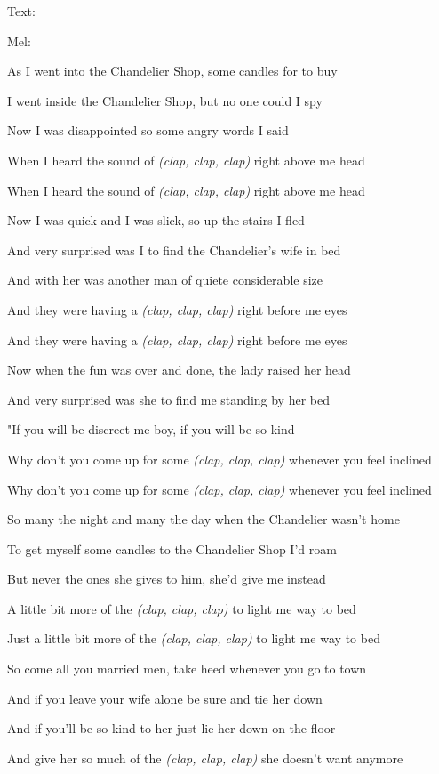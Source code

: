 Text: 

Mel: \bigskip

As I went into the Chandelier Shop, some candles for to buy

I went inside the Chandelier Shop, but no one could I spy

Now I was disappointed so some angry words I said

When I heard the sound of \emph{(clap, clap, clap)} right above me head

When I heard the sound of \emph{(clap, clap, clap)} right above me head\bigskip

Now I was quick and I was slick, so up the stairs I fled

And very surprised was I to find the Chandelier's wife in bed

And with her was another man of quiete considerable size

And they were having a \emph{(clap, clap, clap)} right before me eyes

And they were having a \emph{(clap, clap, clap)} right before me eyes\bigskip

Now when the fun was over and done, the lady raised her head

And very surprised was she to find me standing by her bed

"If you will be discreet me boy, if you will be so kind

Why don't you come up for some \emph{(clap, clap, clap)} whenever you feel inclined

Why don't you come up for some \emph{(clap, clap, clap)} whenever you feel inclined \bigskip

So many the night and many the day when the Chandelier wasn't home

To get myself some candles to the Chandelier Shop I'd roam

But never the ones she gives to him, she'd give me instead

A little bit more of the \emph{(clap, clap, clap)} to light me way to bed

Just a little bit more of the \emph{(clap, clap, clap)} to light me way to bed \bigskip

So come all you married men, take heed whenever you go to town

And if you leave your wife alone be sure and tie her down

And if you'll be so kind to her just lie her down on the floor

And give her so much of the \emph{(clap, clap, clap)} she doesn't want anymore

